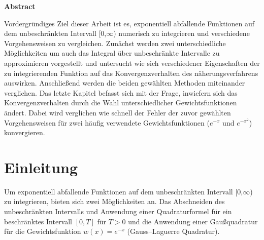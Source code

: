 \documentclass[12pt,a4paper]{scrartcl}
\numberwithin{equation}{section}
\numberwithin{myalgctr}{section}
\numberwithin{mytheoremctr}{subsection}
\numberwithin{mykorollarctr}{subsection}
\numberwithin{mylemmactr}{subsection}
\numberwithin{mybeispielctr}{subsection}
\begin{document}
	\newpage\noindent
	{\LARGE \bfseries Abstract}
	\newline
	\par\noindent
	Vordergründiges Ziel dieser Arbeit ist es, exponentiell abfallende Funktionen auf dem unbeschränkten Intervall [0,$\infty$) numerisch zu integrieren und verschiedene Vorgehensweisen zu vergleichen. Zunächst werden zwei unterschiedliche M\"oglichkeiten um auch das Integral \"uber unbeschr\"ankte Intervalle zu approximieren vorgestellt und untersucht wie sich verschiedener Eigenschaften der zu integrierenden Funktion auf das Konvergenzverhalten des n\"aherungsverfahrens auswirken. %
	Anschließend werden die beiden gew\"ahlten Methoden miteinander verglichen.
	Das letzte Kapitel befasst sich mit der Frage, inwiefern sich das Konvergenzverhalten durch die Wahl unterschiedlicher Gewichtsfunktionen \"andert. Dabei wird verglichen wie schnell der Fehler der zuvor gew\"ahlten Vorgehensweisen f\"ur zwei h\"aufig verwendete Gewichtsfunktionen ($e^{-x}$ und $e^{-x^2}$) konvergieren.
	\thispagestyle{firststyle}
	
	\newpage
	\tableofcontents
	\thispagestyle{general}
	\newpage

	\section{Einleitung}
	Um exponentiell abfallende Funktionen auf dem unbeschränkten Intervall [0,$\infty$) zu integrieren, bieten sich zwei Möglichkeiten an. Das Abschneiden des unbeschränkten Intervalls und Anwendung einer Quadraturformel für ein beschränktes Intervall $[0,T]$ für $T > 0$ und die Anwendung einer Gaußquadratur für die Gewichtsfunktion $w(x) = e^{-x}$ (Gauss–Laguerre Quadratur).
	
	\newpage
\end{document}
